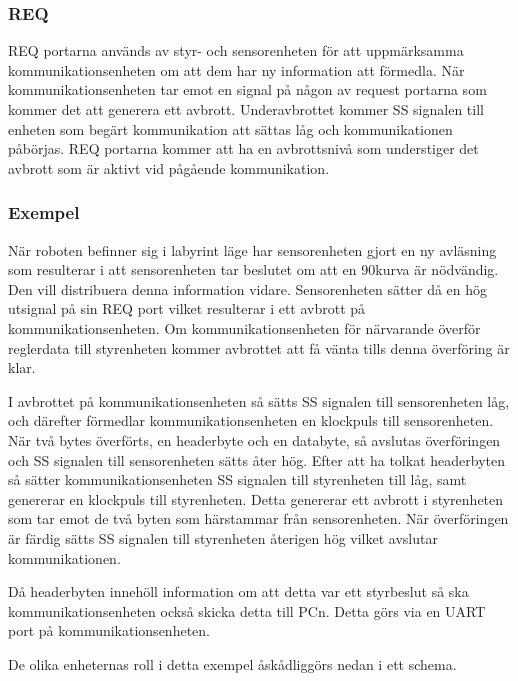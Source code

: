 \subsubsection{REQ}
REQ portarna används av styr- och sensorenheten för att uppmärksamma kommunikationsenheten om att dem har ny information att förmedla. När kommunikationsenheten tar emot en signal på någon av request portarna som kommer det att generera ett avbrott. Underavbrottet kommer SS signalen till enheten som begärt kommunikation att sättas låg och kommunikationen påbörjas.  REQ portarna kommer att ha en avbrottsnivå som understiger det avbrott som är aktivt vid pågående kommunikation.

\subsubsection{Exempel}

När roboten befinner sig i labyrint läge har sensorenheten gjort en ny avläsning som resulterar i att sensorenheten tar beslutet om att en 90\degree kurva är nödvändig. Den vill distribuera denna information vidare. Sensorenheten sätter då en hög utsignal på sin REQ port vilket resulterar i ett avbrott på kommunikationsenheten. Om kommunikationsenheten för närvarande överför reglerdata till styrenheten kommer avbrottet att få vänta tills denna överföring är klar.

I avbrottet på kommunikationsenheten så sätts SS signalen till sensorenheten låg, och därefter förmedlar kommunikationsenheten en klockpuls till sensorenheten. När två bytes överförts, en headerbyte och en databyte, så avslutas överföringen och SS signalen till sensorenheten sätts åter hög. Efter att ha tolkat headerbyten så sätter kommunikationsenheten SS signalen till styrenheten till låg, samt genererar en klockpuls till styrenheten. Detta genererar ett avbrott i styrenheten som tar emot de två byten som härstammar från sensorenheten. När överföringen är färdig sätts SS signalen till styrenheten återigen hög vilket avslutar kommunikationen. 

Då headerbyten innehöll information om att detta var ett styrbeslut så ska kommunikationsenheten också skicka detta till PCn. Detta görs via en UART port på kommunikationsenheten.

De olika enheternas roll i detta exempel åskådliggörs nedan i ett schema.

